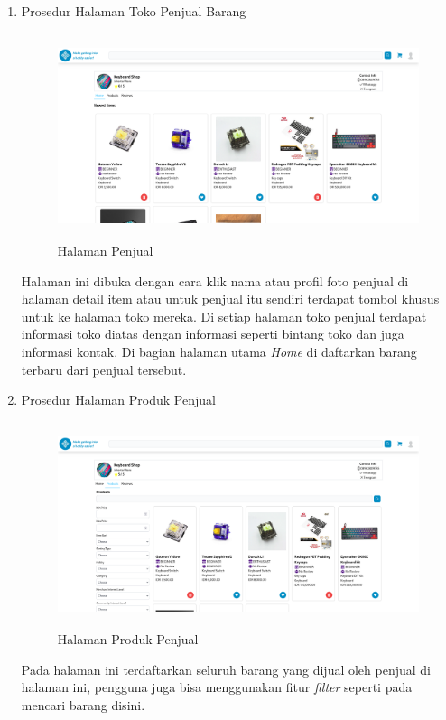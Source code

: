 \documentclass[a4paper]{article}
\begin{document}
\begin{enumerate}
\newpage
\item Prosedur Halaman Toko Penjual Barang

\begin{figure}[h]
    \centering
    \includegraphics*[height=6cm]{images/prosedur pengunaan aplikasi/Halaman Penjual Toko.png}
    \caption{Halaman Penjual}
\end{figure}

Halaman ini dibuka dengan cara klik nama atau profil foto penjual di halaman detail item atau untuk penjual itu sendiri terdapat tombol khusus untuk ke halaman toko mereka. Di setiap halaman toko penjual terdapat informasi toko diatas dengan informasi seperti bintang toko dan juga informasi kontak. Di bagian halaman utama \textit{Home} di daftarkan barang terbaru dari penjual tersebut.

\item Prosedur Halaman Produk Penjual

\begin{figure}[h]
    \centering
    \includegraphics*[height=6cm]{images/prosedur pengunaan aplikasi/Halaman Penjual Produk.png}
    \caption{Halaman Produk Penjual}
\end{figure}

Pada halaman ini terdaftarkan seluruh barang yang dijual oleh penjual di halaman ini, pengguna juga bisa menggunakan fitur \textit{filter} seperti pada mencari barang disini.


\end{enumerate}
\end{document}
